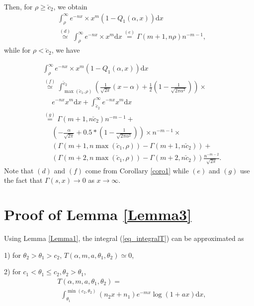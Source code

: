 Then, for $\rho\geq \breve{c}_2$, we obtain
\begin{align}
&    \int_\rho^\infty e^{-nx}\times x^{m}(1-Q_1(\alpha,x))\text{d}x\nonumber\\
  &  \overset{(d)}\simeq\int_\rho^\infty e^{-nx}\times x^{m}\text{d}x
   \overset{(e)}= \Gamma(m+1,n\rho)n^{-m-1}, 
\end{align}
while for $\rho<\breve{c}_2$, we have

\begin{align}
 &  \int_\rho^\infty e^{-nx}\times x^{m}(1-Q_1(\alpha,x))\text{d}x\nonumber\\
&    \overset{(f)}\simeq \int_{\max(\breve{c}_1,\rho)}^{\breve{c}_2} \left(\frac{1}{\sqrt{2\pi}}(x-\alpha) + 
\frac{1}{2}\left(1-\frac{1}{\sqrt{2\pi\alpha^2}}\right)\right)\times\nonumber\\
& ~~~~~~e^{-nx}x^{m}\text{d}x +\int_{\breve{c}_2}^\infty e^{-nx} x^{m}\text{d}x\nonumber\\
& \overset{(g)}= \Gamma(m+1,n\breve{c}_2)n^{-m-1} + \nonumber\\
&~~~~~~\left(-\frac{\alpha}{\sqrt{2\pi}}+0.5*\left(1-\frac{1}{\sqrt{2\pi\alpha^2}}\right)\right)\times n^{-m-1}\times\nonumber\\
&~~~~~~\left(\Gamma\left(m+1,n\max(\breve{c}_1,\rho)\right)-\Gamma\left(m+1,n\breve{c}_2\right)\right)+\nonumber\\
&~~~~~~\left(\Gamma(m+2,n\max(\breve{c}_1,\rho))-\Gamma(m+2,n\breve{c}_2)\right)\frac{n^{-m-2}}{\sqrt{2\pi}}.
\end{align}
Note that $(d)$ and $(f)$ come from Corollary \ref{coro1} while $(e)$ and $(g)$ use the fact that $\Gamma(s,x)\rightarrow 0$ as $x\rightarrow\infty$.


\section{Proof of Lemma \ref{Lemma3}}
\label{proof_Lemma3}
Using Lemma \ref{Lemma1}, the  integral (\ref{eq_integralT})  can be approximated as

1) for $\theta_2>\theta_1>c_2$, $T(\alpha,m,a,\theta_1,\theta_2) \simeq 0$,

2) for $c_1<\theta_1\leq c_2, \theta_2>\theta_1$,
\begin{align}
  &  T(\alpha,m,a,\theta_1,\theta_2) = \nonumber\\& ~~\int_{\theta_1}^{\min(c_2,\theta_2)} (n_2x+n_1)e^{-mx}\log(1+ax) \text{d}x,
\end{align}

